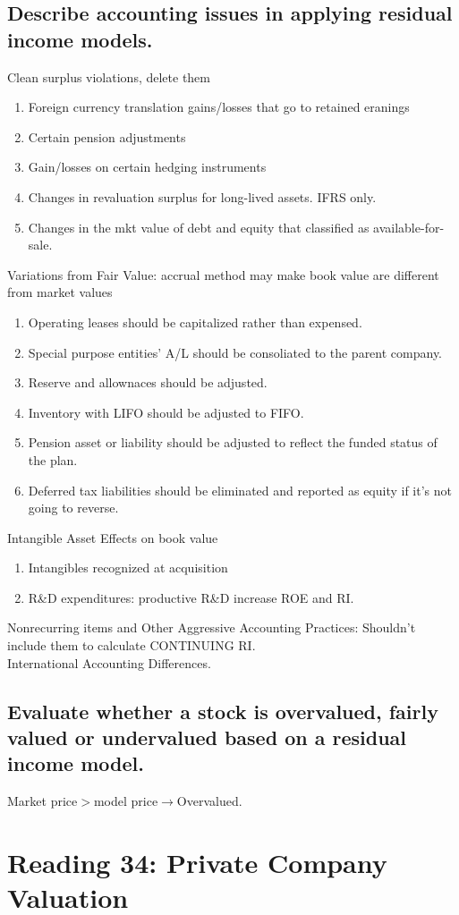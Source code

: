 \documentclass{article}
\newcommand{\be}{\begin{enumerate}}
\newcommand{\ee}{\end{enumerate}}
\newcommand{\ra}{$\rightarrow$}
\begin{document}
\subsection{Describe accounting issues in applying residual income models.}
Clean surplus violations, delete them
\be
    \item Foreign currency translation gains/losses that go to retained eranings
    \item Certain pension adjustments
    \item Gain/losses on certain hedging instruments
    \item Changes in revaluation surplus for long-lived assets. IFRS only.
    \item Changes in the mkt value of debt and equity that classified as available-for-sale.
\ee
Variations from Fair Value: accrual method may make book value are different from market values
\be
    \item Operating leases should be capitalized rather than expensed.
    \item Special purpose entities' A/L should be consoliated to the parent company.
    \item Reserve and allownaces should be adjusted.
    \item Inventory with LIFO should be adjusted to FIFO.
    \item Pension asset or liability should be adjusted to reflect the funded 
        status of the plan.
    \item Deferred tax liabilities should be eliminated and reported as equity if
        it's not going to reverse.
\ee
Intangible Asset Effects on book value
\be
    \item Intangibles recognized at acquisition
    \item R\&D expenditures: productive R\&D increase ROE and RI.
\ee
Nonrecurring items and Other Aggressive Accounting Practices: Shouldn't include them to
calculate CONTINUING RI.
\\International Accounting Differences.
\subsection{Evaluate whether a stock is overvalued, fairly valued or undervalued
based on a residual income model.}
Market price$>$model price\ra Overvalued.


\section{Reading 34: Private Company Valuation}
\end{document}
